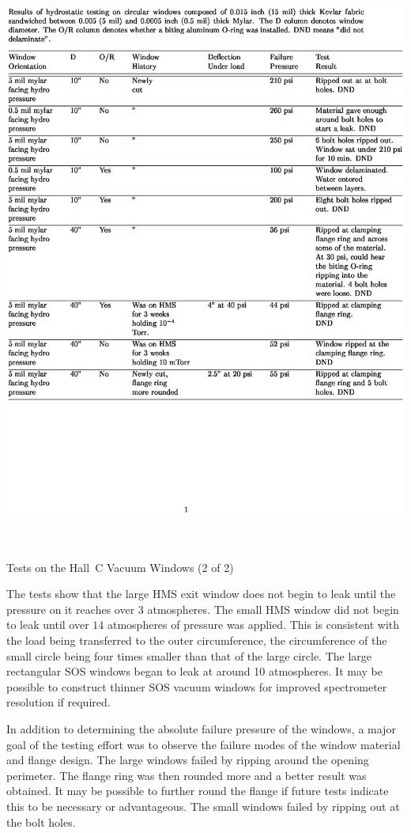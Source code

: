 \begin{table}
\includegraphics[height=7.5in]{vacuumc.ps}
\caption{Tests on the Hall~C Vacuum Windows (2 of 2) \label{tab:win_tst2}}
\end{table}
\clearpage

The tests show that the large HMS exit window does not begin to leak until
the pressure on it reaches over $3$ atmospheres. The small HMS window
did not begin to leak until over $14$ atmospheres of pressure was applied.
This is consistent with the load being transferred to
the outer circumference, the circumference of the small circle being four
times smaller than that of the large circle. The large rectangular SOS windows
began to leak at around 10 atmospheres. It may be possible to construct thinner
SOS vacuum windows for improved spectrometer resolution if required.

In addition to determining the absolute failure
pressure of the windows, a major goal of the testing effort was to
observe the failure modes of the
window material and flange design. The large windows failed by
ripping around the opening perimeter. The flange ring was then
rounded more and
a better result was obtained. It may be possible to further round the
flange if future tests indicate this to be necessary or advantageous.
The small windows failed by ripping out at the bolt holes.


